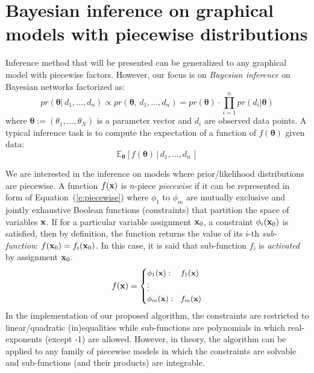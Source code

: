 \section{Bayesian inference on graphical models with piecewise distributions}
\label{sec:inference_piecewise_models}
 Inference method that will be presented can be generalized to  
any graphical model with piecewise factors. However, our focus is on \emph{Bayesian inference} 
on Bayesian networks factorized as: 
\begin{equation}
\label{e:posterior}
pr(\boldsymbol\theta | \, d_1, \ldots, d_n) 
\propto
pr(\boldsymbol\theta, \, d_1, \ldots, d_n) 
= pr(\boldsymbol\theta) \cdot \prod_{i=1}^{n} pr(d_i | \boldsymbol\theta)
\end{equation} 
where $\boldsymbol\theta := (\theta_1, \ldots, \theta_N)$ is a parameter vector and $d_i$ are observed data points. 
A typical inference task %
is to compute the expectation of a function of $f(\boldsymbol\theta)$ given data:
\begin{equation}
\label{e:prob.outcome}
\mathbb{E}_{\boldsymbol\theta}[f(\boldsymbol\theta) \,|\, d_1, \ldots, d_n \,]
\end{equation}


We are interested in the inference on models where prior/likelihood distributions are piecewise.
A function $f(\textbf{x})$ is $n$-piece \emph{piecewise} if it can be represented in form of Equation~(\ref{e:piecewise}) where $\phi_1$ to $\phi_m$ are mutually exclusive and jointly exhaustive Boolean functions (constraints) 
that partition the space of variables $\textbf{x}$. If for a particular variable assignment $\textbf{x}_0$, a constraint $\phi_i(\textbf{x}_0)$ is satisfied, then by definition, the function returns the value of its $i$-th \emph{sub-function}: $f(\textbf{x}_0) = f_i(\textbf{x}_0)$.  
In this case, it is said that sub-function $f_i$ is \emph{activated} by assignment $\textbf{x}_0$.
\begin{equation}
\label{e:piecewise}
f(\bvec{x}) = 
{\footnotesize
\begin{cases}
\phi_1(\bvec{x}) : & f_1(\bvec{x})\\
\vdots\\
\phi_m(\bvec{x}) : & f_m(\bvec{x})
\end{cases}
}%
\end{equation}
In the implementation of our proposed algorithm, the constraints are restricted to linear/quadratic (in)equalities while sub-functions are polynomials in which real-exponents (except -1) are allowed.
However, in theory, the algorithm can be applied to any family of piecewise models in which the constraints are solvable and sub-functions (and their products) are integrable. 

